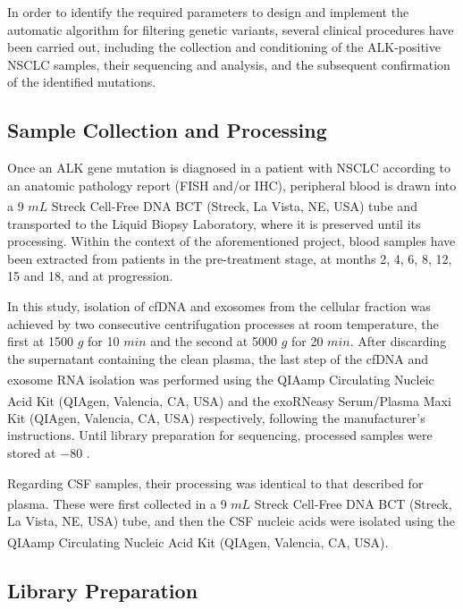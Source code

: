 In order to identify the required parameters to design and implement the automatic algorithm for filtering genetic variants, several clinical procedures have been carried out, including the collection and conditioning of the ALK-positive NSCLC samples, their sequencing and analysis, and the subsequent confirmation of the identified mutations.

\subsection{Sample Collection and Processing}

Once an ALK gene mutation is diagnosed in a patient with NSCLC according to an anatomic pathology report (FISH and\slash or IHC), peripheral blood is drawn into a 9 $mL$ Streck Cell-Free DNA BCT\textsuperscript\textregistered{} (Streck, La Vista, NE, USA) tube and transported to the Liquid Biopsy Laboratory, where it is preserved until its processing. Within the context of the aforementioned project, blood samples have been extracted from patients in the pre-treatment stage, at months 2, 4, 6, 8, 12, 15 and 18, and at progression.

In this study, isolation of cfDNA and exosomes from the cellular fraction was achieved by two consecutive centrifugation processes at room temperature, the first at 1500 $g$ for 10 $min$ and the second at 5000 $g$ for 20 $min$. After discarding the supernatant containing the clean plasma, the last step of the cfDNA and exosome RNA isolation was performed using the QIAamp\textsuperscript\textregistered{} Circulating Nucleic Acid Kit (QIAgen, Valencia, CA, USA) and the exoRNeasy\textsuperscript\textregistered{} Serum/Plasma Maxi Kit (QIAgen, Valencia, CA, USA) respectively, following the manufacturer's instructions. Until library preparation for sequencing, processed samples were stored at $-80$ .

Regarding CSF samples, their processing was identical to that described for plasma. These were first collected in a 9 $mL$ Streck Cell-Free DNA BCT\textsuperscript\textregistered{} (Streck, La Vista, NE, USA) tube, and then the CSF nucleic acids were isolated using the QIAamp\textsuperscript\textregistered{} Circulating Nucleic Acid Kit (QIAgen, Valencia, CA, USA).

\subsection{Library Preparation}

